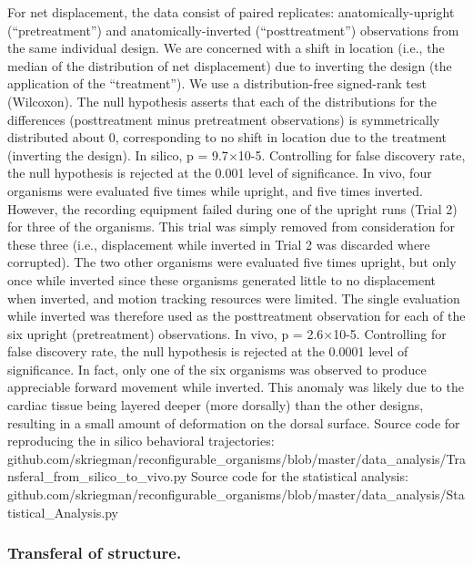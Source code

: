 For net displacement, the data consist of paired replicates: anatomically-upright (``pretreatment'') and anatomically-inverted (``posttreatment'') observations from the same individual design. We are concerned with a shift in location (i.e., the median of the distribution of net displacement) due to inverting the design (the application of the ``treatment''). We use a distribution-free signed-rank test (Wilcoxon). The null hypothesis asserts that each of the distributions for the differences (posttreatment minus pretreatment observations) is symmetrically distributed about 0, corresponding to no shift in location due to the treatment (inverting the design). In silico, p = 9.7{$\times$}10-5. Controlling for false discovery rate, the null hypothesis is rejected at the 0.001 level of significance.
In vivo, four organisms were evaluated five times while upright, and five times inverted. However, the recording equipment failed during one of the upright runs (Trial 2) for three of the organisms. This trial was simply removed from consideration for these three (i.e., displacement while inverted in Trial 2 was discarded where corrupted). The two other organisms were evaluated five times upright, but only once while inverted since these organisms generated little to no displacement when inverted, and motion tracking resources were limited. The single evaluation while inverted was therefore used as the posttreatment observation for each of the six upright (pretreatment) observations. In vivo, p = 2.6{$\times$}10-5. Controlling for false discovery rate, the null hypothesis is rejected at the 0.0001 level of significance.
In fact, only one of the six organisms was observed to produce appreciable forward movement while inverted. This anomaly was likely due to the cardiac tissue being layered deeper (more dorsally) than the other designs, resulting in a small amount of deformation on the dorsal surface. 
Source code for reproducing the in silico behavioral trajectories: github.com/skriegman/reconfigurable\_organisms/blob/master/data\_analysis/Transferal\_from\_silico\_to\_vivo.py
Source code for the statistical analysis: github.com/skriegman/reconfigurable\_organisms/blob/master/data\_analysis/Statistical\_Analysis.py

\subsubsection*{Transferal of structure.}

